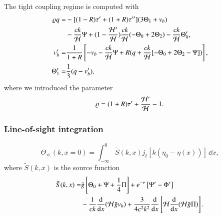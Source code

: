 The tight coupling regime is computed with 
\begin{subequations}
    \begin{align}
        \varrho q =& -[(1-R)\tau' + (1+R)\tau''](3\Theta_1 + v_b) \nonumber \\
            & -\frac{ck}{\mathcal{H}}\Psi + (1-\frac{\mathcal{H}'}{\mathcal{H}})\frac{ck}{\mathcal{H}}(-\Theta_0 + 2\Theta_2) - \frac{ck}{\mathcal{H}}\Theta_0', \\
        v_b' =& \frac{1}{1+R}\left[ -v_b-\frac{ck}{\mathcal{H}}\Psi + R(q+\frac{ck}{\mathcal{H}}[-\Theta_0+2\Theta_2-\Psi]) \right], \\
        \Theta_1' =& \frac{1}{3}(q-v_b'),
    \end{align}
\end{subequations}
where we introduced the parameter 
\begin{equation}
    \varrho = (1+R)\tau' + \frac{\mathcal{H}'}{\mathcal{H}} - 1.
\end{equation}


\subsubsection{Line-of-sight integration}\label{sssec:M3:theory:line_of_sight_integration}

\begin{equation}
    \Theta_\ll(k,x=0) = \int_{-\infty}^0 \tilde{S}(k,x) j_\ell [k(\eta_0 - \eta(x))]\,\dd x, 
\end{equation}
where $\tilde{S}(k,x)$ is the source function 
\begin{equation}
    \begin{split}
        \tilde{S}(k,x) =& \tilde{g} \left[ \Theta_0 + \Psi + \frac{1}{4} \Pi \right] + e^{-\tau}\left[ \Psi' - \Phi' \right] \\
        & - \frac{1}{ck}\dv{x}(\mathcal{H} \tilde{g} v_b) + \frac{3}{4c^2 k^2}\dv{x}\left[ \mathcal{H} \dv{x}(\mathcal{H}\tilde{g}\Pi) \right].
    \end{split}
\end{equation}